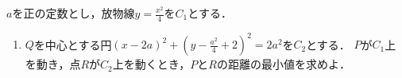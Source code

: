 \documentclass[../../main.tex]{subfiles}
\begin{document}
$a$を正の定数とし，放物線$\displaystyle y=\frac{x^2}{4}$を$C_1$とする．
\begin{enumerate}
  $P$が$C_1$上を動くとき，$P$と点$\displaystyle Q \left( 2a, \,
    \frac{a^2}{4}-2 \right)$の距離の最小値を求めよ．
  \item$Q$を中心とする円$\displaystyle {(x-2a)}^2+
    { \left( y-\frac{a^2}{4}+2 \right) }^2=2a^2$を$C_2$とする．
    $P$が$C_1$上を動き，点$R$が$C_2$上を動くとき，$P$と$R$の距離の最小値を求めよ．
\end{enumerate}
\end{document}
